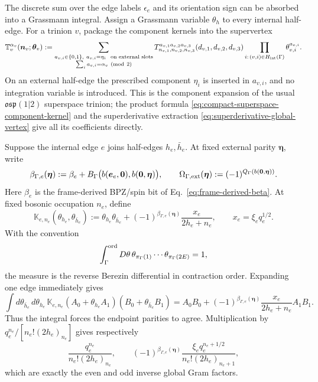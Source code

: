 \documentclass[11pt]{article}
\newcommand{\osp}{\mathfrak{osp}(1|2)}
\begin{document}
The discrete sum over the edge labels \(\epsilon_e\) and its orientation sign
can be absorbed into a Grassmann integral.  Assign a Grassmann variable
\(\theta_h\) to every internal half-edge.  For a trinion \(v\), package the
component kernels into the supervertex
\begin{equation}
 \mathbb T_v^{\alpha_v}(\bm n_v;\bm\theta_v)
 :=\sum_{\substack{a_{v,i}\in\{0,1\},\ 
             a_{v,i}=\eta_i\ \text{ on external slots}\\
             \sum_i a_{v,i}=\alpha_v\ ({\rm mod}\ 2)}}
 T_{n_{v,1},n_{v,2},n_{v,3}}^
  {a_{v,1}a_{v,2}a_{v,3}}
 (d_{v,1},d_{v,2},d_{v,3})
 \prod_{i:\,(v,i)\in H_{\rm int}(\Gamma)}
 \theta_{v,i}^{a_{v,i}}.
 \label{eq:osp-supervertex}
\end{equation}
On an external half-edge the prescribed component \(\eta_i\) is inserted
in \(a_{v,i}\), and no integration variable is introduced.  This is the
component expansion of the usual \(\osp\) superspace trinion; the
product formula \eqref{eq:compact-superspace-component-kernel} and the
superderivative extraction \eqref{eq:superderivative-global-vertex} give all
its coefficients directly.

Suppose the internal edge \(e\) joins half-edges \(h_e,\bar h_e\).  At fixed
external parity \(\bm\eta\), write
\begin{equation}
 \beta_{\Gamma,e}(\bm\eta)
 :=\beta_e+B_\Gamma\bigl(b(\bm e_e,\bm0),
                         b(\bm0,\bm\eta)\bigr),
 \qquad
 \Omega_{\Gamma,{\rm ext}}(\bm\eta)
 :=(-1)^{Q_\Gamma(b(\bm0,\bm\eta))}.
 \label{eq:external-berezin-orientation-data}
\end{equation}
Here \(\beta_e\) is the frame-derived BPZ/spin bit of
Eq.~\eqref{eq:frame-derived-beta}.  At fixed bosonic occupation
\(n_e\), define
\begin{equation}
 \mathbb K_{e,n_e}(\theta_{h_e},\theta_{\bar h_e})
 :=\theta_{h_e}\theta_{\bar h_e}
   +(-1)^{\beta_{\Gamma,e}(\bm\eta)}
    \frac{x_e}{2h_e+n_e},
 \qquad x_e=\xi_e q_e^{1/2}.
 \label{eq:osp-berezin-edge-kernel}
\end{equation}
With the convention
\begin{equation}
 \int_\Gamma^{\rm ord}D\theta\,
 \theta_{\pi_\Gamma(1)}\cdots\theta_{\pi_\Gamma(2E)}=1,
 \label{eq:ordered-berezin-measure}
\end{equation}
the measure is the reverse Berezin differential in contraction order.
Expanding one edge immediately gives
\begin{equation}
 \int d\theta_{\bar h_e}\,d\theta_{h_e}\,
 \mathbb K_{e,n_e}
 (A_0+\theta_{h_e}A_1)
 (B_0+\theta_{\bar h_e}B_1)
 =A_0B_0+(-1)^{\beta_{\Gamma,e}(\bm\eta)}
   \frac{x_e}{2h_e+n_e}A_1B_1.
 \label{eq:single-edge-berezin-contraction}
\end{equation}
Thus the integral forces the endpoint parities to agree.  Multiplication by
\(q_e^{n_e}/[n_e!(2h_e)_{n_e}]\) gives respectively
\begin{equation}
 \frac{q_e^{n_e}}{n_e!(2h_e)_{n_e}},
 \qquad
 (-1)^{\beta_{\Gamma,e}(\bm\eta)}
 \frac{\xi_e q_e^{n_e+1/2}}
      {n_e!(2h_e)_{n_e+1}},
 \label{eq:berezin-even-odd-norms}
\end{equation}
which are exactly the even and odd inverse global Gram factors.
\end{document}
